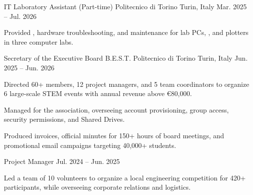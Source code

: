 
\begin{cventries}

  \cventry
    {IT Laboratory Assistant (Part-time)} %
    {Politecnico di Torino} %
    {Turin, Italy} %
    {Mar. 2025 -- Jul. 2026} %
    {
      \begin{cvitems}
        \item {Provided , hardware troubleshooting, and maintenance for lab PCs, , and plotters in three computer labs.}
      \end{cvitems}
    }

  \cventry
    {Secretary of the Executive Board} %
    {B.E.S.T. Politecnico di Torino} %
    {Turin, Italy} %
    {Jun. 2025 -- Jun. 2026} %
    {
      \begin{cvitems} %
        \item {Directed 60+ members, 12 project managers, and 5 team coordinators to organize 6 large-scale STEM events with annual revenue above €80,000.}
        \item {Managed  for the association, overseeing account provisioning, group access, security permissions, and Shared Drives.}
        \item {Produced invoices, official minutes for 150+ hours of board meetings, and promotional email campaigns targeting 40,000+ students.}
      \end{cvitems}
    }

  \vspace{-4pt}

  \cventry
    {Project Manager} %
    {} %
    {} %
    {Jul. 2024 -- Jun. 2025} %
    {
      \begin{cvitems} %
        \item {Led a team of 10 volunteers to organize a local engineering competition for 420+ participants, while overseeing corporate relations and logistics.}
      \end{cvitems}
    }


\end{cventries}
